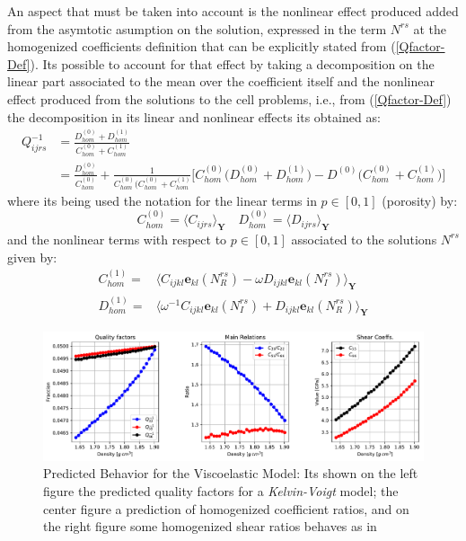 An aspect that must be taken into account is the nonlinear effect produced added from the asymtotic asumption on the solution, expressed in the term $N^{rs}$ at the homogenized coefficients definition that can be explicitly stated from (\ref{Qfactor-Def}).
Its possible to account for that effect by taking a decomposition on the linear part associated to the mean over the coefficient itself and the nonlinear effect produced from the solutions to the cell problems, i.e., from (\ref{Qfactor-Def}) the decomposition in its linear and nonlinear effects its obtained as:
\begin{equation}
    \label{Expansion-Qfactor}
    \begin{aligned}
        Q_{ijrs}^{-1}  & = \frac{D_{hom}^{(0)} + D_{hom}^{(1)}}{C_{hom}^{(0)} + C_{hom}^{(1)}}  \\
         & =  \frac{D_{hom}^{(0)}}{C_{hom}^{(0)}} + \frac{1}{C^{(0)}_{hom}( C^{(0)}_{hom} + C^{(1)}_{hom}} \big[C^{(0)}_{hom} \big( D^{(0)}_{hom} + D^{(1)}_{hom}\big) - D^{(0)}\big( C^{(0)}_{hom} + C^{(1)}_{hom} \big) \big]
    \end{aligned}
\end{equation}
where its being used the notation for the linear terms in $p \in [0,1]$ (porosity) by:
\begin{equation*}
    C^{(0)}_{hom} = \langle C_{ijrs} \rangle_{\mathbf{Y}} \quad  D^{(0)}_{hom} = \langle D_{ijrs} \rangle_{\mathbf{Y}}
\end{equation*}
and the nonlinear terms with respect to $p \in [0,1]$ associated to the solutions $N^{rs}$ given by:
\begin{equation*}
    \begin{array}{cc}
        C^{(1)}_{hom} =& \langle C_{ijkl}\mathbf{e}_{kl}(N^{rs}_R) - \omega D_{ijkl}\mathbf{e}_{kl}(N^{rs}_I) \rangle_{\mathbf{Y}} \\
        D^{(1)}_{hom} =& \langle \omega^{-1} C_{ijkl}\mathbf{e}_{kl}(N^{rs}_I) + D_{ijkl}\mathbf{e}_{kl}(N^{rs}_R) \rangle_{\mathbf{Y}} 
    \end{array}
\end{equation*}

\begin{figure}[!h]
	\centering
	\includegraphics[width=\textwidth]{images/Qfactors/CellProb_QfactorCircular5E-2_Relations.pdf}
	\caption{Predicted Behavior for the Viscoelastic Model: Its shown on the left figure the predicted quality factors for a \textit{Kelvin-Voigt} model; the center figure a prediction of homogenized coefficient ratios, and on the right figure some homogenized shear ratios behaves as in \cite{Bernard2015} }
	\label{PredictionHomCoeffs-Qfactor}
\end{figure} 


